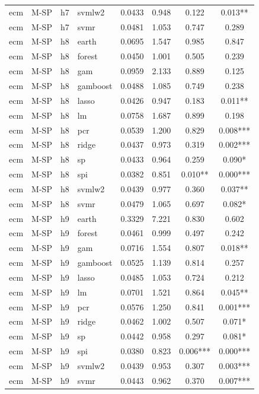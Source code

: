 \begin{ThreePartTable}
\begin{longtable}[t]{llclcccc}
ecm & M-SP & h7 & svmlw2 & 0.0433 & 0.948 & 0.122 & 0.013**\\
ecm & M-SP & h7 & svmr & 0.0481 & 1.053 & 0.747 & 0.289\\
\addlinespace
ecm & M-SP & h8 & earth & 0.0695 & 1.547 & 0.985 & 0.847\\
ecm & M-SP & h8 & forest & 0.0450 & 1.001 & 0.505 & 0.239\\
ecm & M-SP & h8 & gam & 0.0959 & 2.133 & 0.889 & 0.125\\
ecm & M-SP & h8 & gamboost & 0.0488 & 1.085 & 0.749 & 0.238\\
ecm & M-SP & h8 & lasso & 0.0426 & 0.947 & 0.183 & 0.011**\\
ecm & M-SP & h8 & lm & 0.0758 & 1.687 & 0.899 & 0.198\\
ecm & M-SP & h8 & pcr & 0.0539 & 1.200 & 0.829 & 0.008***\\
ecm & M-SP & h8 & ridge & 0.0437 & 0.973 & 0.319 & 0.002***\\
ecm & M-SP & h8 & sp & 0.0433 & 0.964 & 0.259 & 0.090*\\
ecm & M-SP & h8 & spi & 0.0382 & 0.851 & 0.010** & 0.000***\\
ecm & M-SP & h8 & svmlw2 & 0.0439 & 0.977 & 0.360 & 0.037**\\
ecm & M-SP & h8 & svmr & 0.0479 & 1.065 & 0.697 & 0.082*\\
\addlinespace
ecm & M-SP & h9 & earth & 0.3329 & 7.221 & 0.830 & 0.602\\
ecm & M-SP & h9 & forest & 0.0461 & 0.999 & 0.497 & 0.242\\
ecm & M-SP & h9 & gam & 0.0716 & 1.554 & 0.807 & 0.018**\\
ecm & M-SP & h9 & gamboost & 0.0525 & 1.139 & 0.814 & 0.257\\
ecm & M-SP & h9 & lasso & 0.0485 & 1.053 & 0.724 & 0.212\\
ecm & M-SP & h9 & lm & 0.0701 & 1.521 & 0.864 & 0.045**\\
ecm & M-SP & h9 & pcr & 0.0576 & 1.250 & 0.841 & 0.001***\\
ecm & M-SP & h9 & ridge & 0.0462 & 1.002 & 0.507 & 0.071*\\
ecm & M-SP & h9 & sp & 0.0442 & 0.958 & 0.297 & 0.081*\\
ecm & M-SP & h9 & spi & 0.0380 & 0.823 & 0.006*** & 0.000***\\
ecm & M-SP & h9 & svmlw2 & 0.0439 & 0.953 & 0.307 & 0.003***\\
ecm & M-SP & h9 & svmr & 0.0443 & 0.962 & 0.370 & 0.007***\\

\end{longtable}
\end{ThreePartTable}
